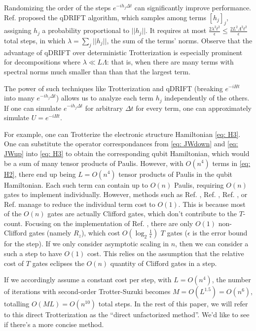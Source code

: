 Randomizing the order of the steps $e^{-ih_j\Delta t}$ can significantly improve performance. Ref. \cite{QDRIFT} proposed the qDRIFT algorithm, which samples among terms $[h_j]_j$, assigning $h_j$ a probability proportional to $||h_j||$. It requires at most $\frac{2\lambda^2 t^2}{\epsilon} \leq \frac{2L^2\Lambda^2 t^2}{\epsilon}$ total steps, in which $\lambda = \sum_j ||h_j||$, the sum of the terms' norms. Observe that the advantage of qDRIFT over deterministic Trotterization is especially prominent for decompositions where $\lambda \ll L\Lambda$: that is, when there are many terms with spectral norms much smaller than than that the largest term.

The power of such techniques like Trotterization and qDRIFT (breaking $e^{-iHt}$ into many $e^{-ih_j\Delta t}$) allows us to analyze each term $h_j$ independently of the others. If one can simulate $e^{-ih_j \Delta t}$ for arbitrary $\Delta t$ for every term, one can approximately simulate $U = e^{-iHt}$.

For example, one can Trotterize the electronic structure Hamiltonian \eqref{eq: H3}. One can substitute the operator correspondances from \eqref{eq: JWdown} and \eqref{eq: JWup} into \eqref{eq: H3} to obtain the corresponding qubit Hamiltonian, which would be a sum of many tensor products of Paulis. However, with $O(n^4)$ terms in \eqref{eq: H2}, there end up being $L = O(n^4)$ tensor products of Paulis in the qubit Hamiltonian. Each such term can contain up to $O(n)$ Paulis, requiring $O(n)$ gates to implement individually. However, methods such as Ref. \cite{Amortize1}, Ref. \cite{Amortize2}, Ref. \cite{Amortize3}, or Ref. \cite{Amortize4} manage to reduce the individual term cost to $O(1)$. This is because most of the $O(n)$ gates are actually Clifford gates, which don't contribute to the $T$-count. Focusing on the implementation of Ref. \cite{Amortize4}, there are only $O(1)$ non-Clifford gates (namely $R_z$), which cost $O(\log_2{\frac{1}{\epsilon}})$ $T$ gates ($\epsilon$ is the error bound for the step). If we only consider asymptotic scaling in $n$, then we can consider a such a step to have $O(1)$ cost. This relies on the assumption that the relative cost of $T$ gates eclipses the $O(n)$ quantity of Clifford gates in a step.

If we accordingly assume a constant cost per step, with $L = O(n^4)$, the number of iterations with second-order Trotter-Suzuki becomes $M = O(L^{1.5}) = O(n^6)$, totalling $O(ML) = O(n^{10})$ total steps. In the rest of this paper, we will refer to this direct Trotterization as the ``direct unfactorized method''. We'd like to see if there's a more concise method.

